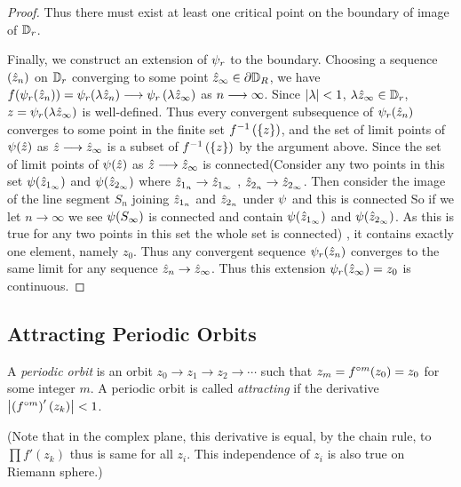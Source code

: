 \documentclass[../main.tex]{subfiles}
\begin{document}
\begin{proof}
    Thus there must exist at least one critical point on the boundary of image of $\mathbb{D}_r$.

    Finally, we construct an extension of $\psi_r$ to the boundary.
     Choosing a sequence $(\hat{z}_n)$ on $\mathbb{D}_r$ converging to some point $\hat{z}_\infty \in \partial \mathbb{D}_{R}$, we have $f(\psi_r(\hat{z}_n))=\psi_r(\lambda \hat{z}_{n}) \longrightarrow \psi_r\left(\lambda \hat{z}_{\infty}\right)$ as $n \longrightarrow \infty$. Since $\left|\lambda\right|<1$, $\lambda \hat{z}_{\infty}\in\mathbb{D}_{r}$,  $z=\psi_r(\lambda \hat{z}_{\infty})$ is well-defined. Thus every convergent subsequence of $\psi_r (\hat{z}_{n})$ converges to some point in the finite set $f^{-1}\left(\{z\}\right)$, and the set of limit points of $\psi(\hat{z})$ as $\hat{z} \longrightarrow \hat{z}_{\infty}$ is a subset of $f^{-1}\left(\left\{z\right\}\right)$ by the argument above. Since the set of limit points of $\psi(\hat{z})$ as $\hat{z} \longrightarrow \hat{z}_{\infty}$ is connected(Consider any two points in this set $\psi(\hat{z}_{1_\infty})$ and $\psi(\hat{z}_{2_\infty})$ where $\hat{z}_{1_{n}} \rightarrow  \hat{z}_{1_\infty}$ , $\hat{z}_{2_{n}} \rightarrow  \hat{z}_{2_\infty}$. Then consider the image of the line segment $S_{n}$ joining $\hat{z}_{1_{n}}$ and $\hat{z}_{2_{n}}$ under $\psi$ and this is connected  So if we let $n\rightarrow \infty$ we see $\psi(S_{\infty})$ is connected and contain $\psi(\hat{z}_{1_\infty})$ and $\psi(\hat{z}_{2_\infty})$. As this is true for any two points in this set the whole set is connected) ,
    it contains exactly one element, namely $z_{0}$. Thus any convergent sequence $\psi_r(\hat{z}_n)$ converges to the same limit for any sequence $\hat{z}_{n} \to \hat{z}_{\infty}$. Thus this extension $\psi_r(\hat{z}_{\infty})=z_{0}$ is continuous.
\end{proof} 

\subsection{Attracting Periodic Orbits}

\begin{dfn}
    A \emph{periodic orbit} is an orbit $z_0 \rightarrow z_1 \rightarrow z_2 \rightarrow \cdots $ such that $z_m =f^{\circ m}(z_0)=z_0$ for some integer $m$. A periodic orbit is called \emph{attracting} if the derivative $\left|\left(f^{\circ m}\right)'\left(z_{k}\right)\right|<1$. 
    
    (Note that in the complex plane, this derivative is equal, by the chain rule, to $ \prod f'(z_k)$ thus is same for all $z_i$. This independence of $z_i$ is also true on Riemann sphere.)
\end{dfn}
\end{document}
